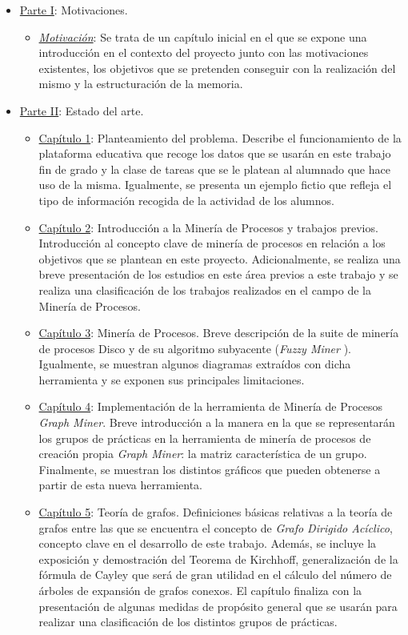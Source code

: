 \begin{itemize}
\item \hyperref[sec:parteI]{Parte I}: Motivaciones.
\begin{itemize}
\item \hyperref[sec:motivation]{\emph{Motivación}}: Se trata de un capítulo inicial en el que se expone una introducción en el contexto del proyecto junto con las motivaciones existentes, los objetivos que se pretenden conseguir con la realización del mismo y la estructuración de la memoria.
\end{itemize}
\item \hyperref[sec:parteII]{Parte II}: Estado del arte.
\begin{itemize}
\item \hyperref[sec:chapterI]{Capítulo 1}: Planteamiento del problema. Describe el funcionamiento de la plataforma educativa que recoge los datos que se usarán en este trabajo fin de grado y la clase de tareas que se le platean al alumnado que hace uso de la misma. Igualmente, se presenta un ejemplo fictio que refleja el tipo de información recogida de la actividad de los alumnos.
\item \hyperref[sec:chapterII]{Capítulo 2}: Introducción a la Minería de Procesos y trabajos previos. Introducción al concepto clave de minería de procesos en relación a los objetivos que se plantean en este proyecto. Adicionalmente, se realiza una breve presentación de los estudios en este área previos a este trabajo y se realiza una clasificación de los trabajos realizados en el campo de la Minería de Procesos.
\item \hyperref[sec:chapterIII]{Capítulo 3}: Minería de Procesos. Breve descripción de la suite de minería de procesos Disco \cite{gunther2012disco} y de su algoritmo subyacente (\emph{Fuzzy Miner} \cite{gunther2007fuzzy}). Igualmente, se muestran algunos diagramas extraídos con dicha herramienta y se exponen sus principales limitaciones.
\item \hyperref[sec:chapterIV]{Capítulo 4}: Implementación de la herramienta de Minería de Procesos \emph{Graph Miner}. Breve introducción a la manera en la que se representarán los grupos de prácticas en la herramienta de minería de procesos de creación propia \emph{Graph Miner}: la matriz característica de un grupo. Finalmente, se muestran los distintos gráficos que pueden obtenerse a partir de esta nueva herramienta.
\item \hyperref[sec:chapterV]{Capítulo 5}: Teoría de grafos. Definiciones básicas relativas a la teoría de grafos entre las que se encuentra el concepto de \emph{Grafo Dirigido Acíclico}, concepto clave en el desarrollo de este trabajo. Además, se incluye la exposición y demostración del Teorema de Kirchhoff, generalización de la fórmula de Cayley que será de gran utilidad en el cálculo del número de árboles de expansión de grafos conexos. El capítulo finaliza con la presentación de algunas medidas de propósito general que se usarán para realizar una clasificación de los distintos grupos de prácticas.

\end{itemize}
\end{itemize}
